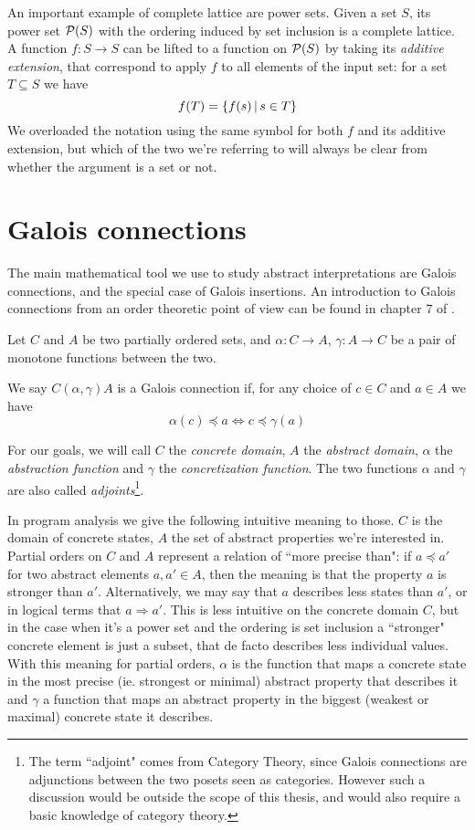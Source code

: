 An important example of complete lattice are power sets. Given a set $S$, its power set $\mathcal{P}(S)$ with the ordering induced by set inclusion is a complete lattice. A function $f : S \rightarrow S$ can be lifted to a function on $\mathcal{P}(S)$ by taking its \textit{additive extension}, that correspond to apply $f$ to all elements of the input set: for a set $T \subseteq S$ we have
\[
f(T) = \{ f(s) \,\vert\, s \in T \}
\]
We overloaded the notation using the same symbol for both $f$ and its additive extension, but which of the two we're referring to will always be clear from whether the argument is a set or not.

\section{Galois connections}
The main mathematical tool we use to study abstract interpretations are Galois connections, and the special case of Galois insertions. An introduction to Galois connections from an order theoretic point of view can be found in chapter 7 of \cite{order-theory-book}.

\begin{definition}\label{ch2:def:gc}
	Let $C$ and $A$ be two partially ordered sets, and $\alpha : C \rightarrow A$, $\gamma : A \rightarrow C$ be a pair of monotone functions between the two.

	We say $C (\alpha, \gamma) A$ is a Galois connection if, for any choice of $c \in C$ and $a \in A$ we have
	\[
	\alpha(c) \preceq a \iff c \preceq \gamma(a)
	\]
\end{definition}
For our goals, we will call $C$ the \textit{concrete domain}, $A$ the \textit{abstract domain}, $\alpha$ the \textit{abstraction function} and $\gamma$ the \textit{concretization function}. The two functions $\alpha$ and $\gamma$ are also called \textit{adjoints}\footnote{The term ``adjoint" comes from Category Theory, since Galois connections are adjunctions between the two posets seen as categories. However such a discussion would be outside the scope of this thesis, and would also require a basic knowledge of category theory.}.

In program analysis we give the following intuitive meaning to those. $C$ is the domain of concrete states, $A$ the set of abstract properties we're interested in. Partial orders on $C$ and $A$ represent a relation of ``more precise than": if $a \preceq a'$ for two abstract elements $a, a' \in A$, then the meaning is that the property $a$ is stronger than $a'$. Alternatively, we may say that $a$ describes less states than $a'$, or in logical terms that $a \Rightarrow a'$. This is less intuitive on the concrete domain $C$, but in the case when it's a power set and the ordering is set inclusion a ``stronger" concrete element is just a subset, that de facto describes less individual values.
With this meaning for partial orders, $\alpha$ is the function that maps a concrete state in the most precise (ie. strongest or minimal) abstract property that describes it and $\gamma$ a function that maps an abstract property in the biggest (weakest or maximal) concrete state it describes.

